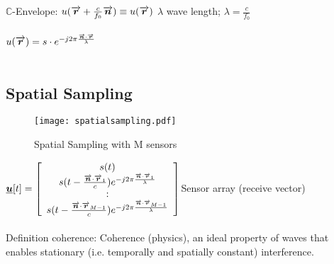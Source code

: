 \null\qquad \pfeil $\mathbb{C}$-Envelope: 
$u(\overrightarrow{\boldsymbol {r}}+ \frac{c}{f_0}\overrightarrow{\boldsymbol {n}})\equiv u(\overrightarrow{\boldsymbol {r}})$ \qquad $\lambda$ wave length; $\lambda =\frac{c}{f_0} $\\ \ \\
\null\qquad \pfeil $u(\overrightarrow{\boldsymbol {r}}) = s\cdot  e^{-j2\pi \frac{\overrightarrow{\boldsymbol {n}}\cdot\overrightarrow{\boldsymbol {r}}}{\lambda}}$\\ \ \\

\subsection{Spatial Sampling}

\begin{figure}[H]
	\centering
	\texttt{[image: spatialsampling.pdf]}
	\caption{Spatial Sampling with M sensors}
	\label{sampling} 
\end{figure}
$\underline{\boldsymbol {u}}[t]= \left[\begin{array}{c}
s(t)\\ s(t-\frac{\overrightarrow{\boldsymbol {n}}\cdot\overrightarrow{\boldsymbol {r}}_1}{c})e^{-j2\pi \frac{\overrightarrow{\boldsymbol {n}}\cdot \overrightarrow{\boldsymbol {r}}_1}{\lambda}}\\ : \\s(t-\frac{\overrightarrow{\boldsymbol {n}}\cdot \overrightarrow{\boldsymbol {r}}_{M-1}}{c})e^{-j2\pi \frac{\overrightarrow{\boldsymbol {n}}\cdot \overrightarrow{\boldsymbol {r}}_{M-1}}{\lambda}} 
\end{array}\right] $\pfeil Sensor array (receive vector)\\ \ \\
Definition coherence: Coherence (physics), an ideal property of waves that enables stationary (i.e. temporally and spatially constant) interference.
